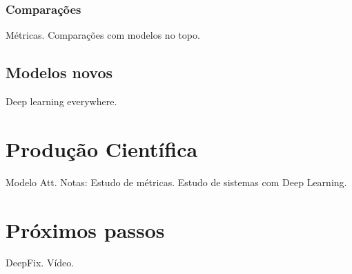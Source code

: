 \documentclass[11pt]{article}
\begin{document}
\subsubsection{Comparações}
Métricas.
Comparações com modelos no topo.

\subsection{Modelos novos}
Deep learning everywhere.

\section{Produção Científica}
Modelo Att.
Notas: Estudo de métricas.
Estudo de sistemas com Deep Learning.

\section{Próximos passos}
DeepFix. Vídeo.

\printbibliography
\end{document}
